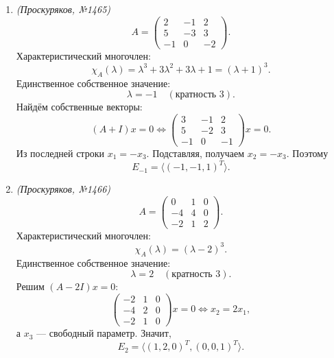 \begin{enumerate}
Для \(\lambda=3\):
\[
(A-3I)x=0 \iff
\begin{pmatrix}0&1&0\\0&0&1\\0&0&-1\end{pmatrix}x=0
\iff x_2=x_3=0,
\]
то есть
\[
E_3=\langle (1,0,0)^T\rangle.
\]

Для \(\lambda=2\):
\[
(A-2I)x=0 \iff
\begin{pmatrix}1&1&0\\0&1&1\\0&0&0\end{pmatrix}x=0
\iff x_1=-x_2,\ x_3=-x_2,
\]
то есть
\[
E_2=\langle (1,-1,1)^T\rangle.
\]

Геометрическая кратность собственного значения \(3\) равна \(1\), а алгебраическая кратность равна \(2\), поэтому матрица \textbf{не диагонализуема}.

\item \textit{(Проскуряков, №1465)}
\[
A=\begin{pmatrix}
2&-1&2\\
5&-3&3\\
-1&0&-2
\end{pmatrix}.
\]
Характеристический многочлен:
\[
\chi_A(\lambda)=\lambda^3+3\lambda^2+3\lambda+1=(\lambda+1)^3.
\]
Единственное собственное значение:
\[
\lambda=-1 \quad (\text{кратность }3).
\]
Найдём собственные векторы:
\[
(A+I)x=0 \iff
\begin{pmatrix}
3&-1&2\\
5&-2&3\\
-1&0&-1
\end{pmatrix}x=0.
\]
Из последней строки \(x_1=-x_3\). Подставляя, получаем \(x_2=-x_3\). Поэтому
\[
E_{-1}=\langle (-1,-1,1)^T\rangle.
\]

\item \textit{(Проскуряков, №1466)}
\[
A=\begin{pmatrix}
0&1&0\\
-4&4&0\\
-2&1&2
\end{pmatrix}.
\]
Характеристический многочлен:
\[
\chi_A(\lambda)=(\lambda-2)^3.
\]
Единственное собственное значение:
\[
\lambda=2 \quad (\text{кратность }3).
\]
Решим \((A-2I)x=0\):
\[
\begin{pmatrix}
-2&1&0\\
-4&2&0\\
-2&1&0
\end{pmatrix}x=0
\iff x_2=2x_1,
\]
а \(x_3\) --- свободный параметр. Значит,
\[
E_2=\langle (1,2,0)^T,(0,0,1)^T\rangle.
\]


\end{enumerate}
